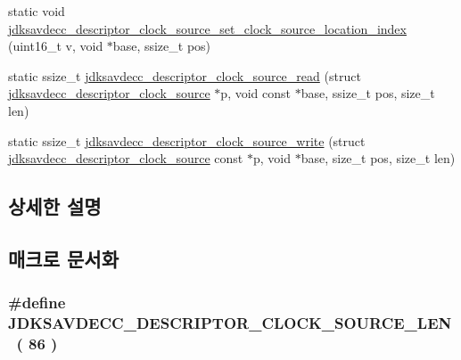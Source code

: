 \begin{DoxyCompactItemize}
\item 
static void \hyperlink{group__descriptor__clock__source_ga20cd4817d1ebf40d43d0a6301b59d86a}{jdksavdecc\+\_\+descriptor\+\_\+clock\+\_\+source\+\_\+set\+\_\+clock\+\_\+source\+\_\+location\+\_\+index} (uint16\+\_\+t v, void $\ast$base, ssize\+\_\+t pos)
\item 
static ssize\+\_\+t \hyperlink{group__descriptor__clock__source_ga725ff5fcf4ab61a873008095e810e1f0}{jdksavdecc\+\_\+descriptor\+\_\+clock\+\_\+source\+\_\+read} (struct \hyperlink{structjdksavdecc__descriptor__clock__source}{jdksavdecc\+\_\+descriptor\+\_\+clock\+\_\+source} $\ast$p, void const $\ast$base, ssize\+\_\+t pos, size\+\_\+t len)
\item 
static ssize\+\_\+t \hyperlink{group__descriptor__clock__source_gaf3c785269953d9e38e4cfbf0bf45bfe6}{jdksavdecc\+\_\+descriptor\+\_\+clock\+\_\+source\+\_\+write} (struct \hyperlink{structjdksavdecc__descriptor__clock__source}{jdksavdecc\+\_\+descriptor\+\_\+clock\+\_\+source} const $\ast$p, void $\ast$base, size\+\_\+t pos, size\+\_\+t len)
\end{DoxyCompactItemize}


\subsection{상세한 설명}


\subsection{매크로 문서화}
\subsubsection[{\texorpdfstring{J\+D\+K\+S\+A\+V\+D\+E\+C\+C\+\_\+\+D\+E\+S\+C\+R\+I\+P\+T\+O\+R\+\_\+\+C\+L\+O\+C\+K\+\_\+\+S\+O\+U\+R\+C\+E\+\_\+\+L\+EN}{JDKSAVDECC_DESCRIPTOR_CLOCK_SOURCE_LEN}}]{\setlength{\rightskip}{0pt plus 5cm}\#define J\+D\+K\+S\+A\+V\+D\+E\+C\+C\+\_\+\+D\+E\+S\+C\+R\+I\+P\+T\+O\+R\+\_\+\+C\+L\+O\+C\+K\+\_\+\+S\+O\+U\+R\+C\+E\+\_\+\+L\+EN~( 86 )}\hypertarget{group__descriptor__clock__source_ga66ee17894f56080a6071a858519f83cd}{}\label{group__descriptor__clock__source_ga66ee17894f56080a6071a858519f83cd}



